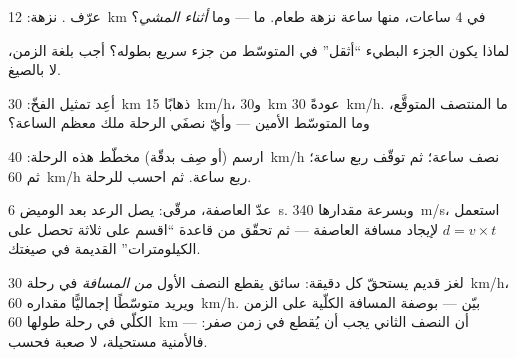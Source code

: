 \begin{exercise}[$\star$]\label{exo:g7:motion-average-speed:7}
عرّف . نزهة: \qty{12}{km} في $4$ ساعات، منها
ساعة نزهة طعام. ما  --- وما 
\emph{أثناء المشي}؟
\end{exercise}

\begin{exercise}[$\star\star$]\label{exo:g7:motion-average-speed:8}
لماذا يكون الجزء البطيء ``أثقل'' في المتوسّط من جزء سريع بطوله؟
أجب بلغة الزمن، لا بالصيغ.
\end{exercise}

\begin{exercise}[$\star\star$]\label{exo:g7:motion-average-speed:9}
أعِد تمثيل الفخّ: \qty{30}{km} ذهابًا  \qty{15}{km/h}،
و\qty{30}{km} عودةً  \qty{30}{km/h}. ما المنتصف المتوقَّع،
وما المتوسّط الأمين --- وأيّ نصفَي الرحلة ملك معظم الساعة؟
\end{exercise}

\begin{exercise}[$\star\star$]\label{exo:g7:motion-average-speed:10}
ارسم (أو صِف بدقّة) مخطّط هذه الرحلة:  
\qty{40}{km/h} نصف ساعة؛ ثم توقّف ربع ساعة؛ ثم 
 \qty{60}{km/h} ربع ساعة. ثم احسب 
للرحلة.
\end{exercise}

\begin{exercise}[$\star\star$]\label{exo:g7:motion-average-speed:11}
عدّ العاصفة، مرقّى: يصل الرعد بعد الوميض \qty{6}{s}. وبسرعة 
مقدارها \qty{340}{m/s}، استعمل $d = v \times t$ لإيجاد مسافة
العاصفة --- ثم تحقّق من قاعدة ``اقسم على ثلاثة تحصل على
الكيلومترات'' القديمة في  صيغتك.
\end{exercise}

\begin{exercise}[$\star\star\star$]\label{exo:g7:motion-average-speed:12}
لغز قديم يستحقّ كل دقيقة: سائق يقطع النصف الأول \emph{من
المسافة} في رحلة  \qty{30}{km/h}، ويريد متوسّطًا إجماليًّا
مقداره \qty{60}{km/h}. بيّن --- بوصفة المسافة الكلّية على الزمن
الكلّي في رحلة طولها \qty{60}{km} --- أن النصف الثاني يجب أن
يُقطع في زمن صفر: فالأمنية مستحيلة، لا صعبة فحسب.
\end{exercise}

